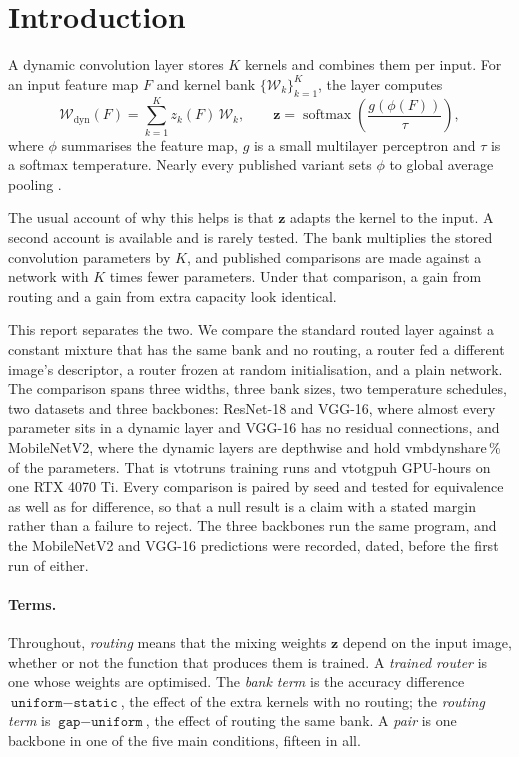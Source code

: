 \documentclass[10pt,a4paper]{article}
\newcommand{\zv}{\mathbf{z}}
\newcommand{\V}[1]{\csname v#1\endcsname}
\begin{document}
\section{Introduction}\label{sec:intro}

A dynamic convolution layer stores $K$ kernels and combines them per
input. For an input feature map $F$ and kernel bank
$\{\mathcal{W}_k\}_{k=1}^{K}$, the layer computes
\begin{equation}
\mathcal{W}_{\text{dyn}}(F)=\sum_{k=1}^{K} z_k(F)\,\mathcal{W}_k,
\qquad
\zv=\operatorname{softmax}\!\left(\frac{g(\phi(F))}{\tau}\right),
\label{eq:dynconv}
\end{equation}
where $\phi$ summarises the feature map, $g$ is a small multilayer
perceptron and $\tau$ is a softmax temperature. Nearly every published
variant sets $\phi$ to global average pooling
\citep{yang2019condconv,chen2020dynamic}.

The usual account of why this helps is that $\zv$ adapts the kernel to
the input. A second account is available and is rarely tested. The bank
multiplies the stored convolution parameters by $K$, and published
comparisons are made against a network with $K$ times fewer parameters.
Under that comparison, a gain from routing and a gain from extra
capacity look identical.

This report separates the two. We compare the standard routed layer
against a constant mixture that has the same bank and no routing, a
router fed a different image's descriptor, a router frozen at random
initialisation, and a plain network. The comparison spans three widths,
three bank sizes, two temperature schedules, two datasets and three
backbones: ResNet-18 and VGG-16, where almost every parameter sits in a
dynamic layer and VGG-16 has no residual connections, and MobileNetV2,
where the dynamic layers are depthwise and hold \V{mbdynshare}\,\% of the
parameters. That is \V{totruns} training runs and \V{totgpuh} GPU-hours on
one RTX 4070 Ti. Every comparison is paired by seed and tested for
equivalence as well as for difference, so that a null result is a claim
with a stated margin rather than a failure to reject. The three backbones
run the same program, and the MobileNetV2 and VGG-16 predictions were
recorded, dated, before the first run of either.

\paragraph{Terms.} Throughout, \emph{routing} means that the mixing
weights $\zv$ depend on the input image, whether or not the function that
produces them is trained. A \emph{trained router} is one whose weights are
optimised. The \emph{bank term} is the accuracy difference
$\texttt{uniform}-\texttt{static}$, the effect of the extra kernels with
no routing; the \emph{routing term} is $\texttt{gap}-\texttt{uniform}$,
the effect of routing the same bank. A \emph{pair} is one backbone in one
of the five main conditions, fifteen in all.
\end{document}
